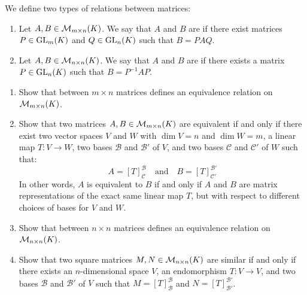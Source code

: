 \begin{definition}
\label{def:equivalence_and_similarity}
We define two types of relations between matrices:
\begin{enumerate}
    \item Let $A, B \in \mathcal{M}_{m \times n}(K)$. We say that $A$ and $B$ are  if there exist matrices $P \in \operatorname{GL}_m(K)$ and $Q \in \operatorname{GL}_n(K)$ such that $B = P A Q$.
    \item Let $A, B \in \mathcal{M}_{n \times n}(K)$. We say that $A$ and $B$ are  if there exists a matrix $P \in \operatorname{GL}_n(K)$ such that $B = P^{-1} A P$.
\end{enumerate}
\end{definition}

\begin{exercise}
\label{exc:equivalence_similarity_properties}
\begin{enumerate}[label=\textbf{(\alph*)}]
    \item Show that  between $m \times n$ matrices defines an equivalence relation on $\mathcal{M}_{m \times n}(K)$.
    \item Show that two matrices $A, B \in \mathcal{M}_{m \times n}(K)$ are equivalent if and only if there exist two vector spaces $V$ and $W$ with $\dim V = n$ and $\dim W = m$, a linear map $T \colon V \to W$, two bases $\mathcal{B}$ and $\mathcal{B}'$ of $V$, and two bases $\mathcal{C}$ and $\mathcal{C}'$ of $W$ such that:
    \begin{equation*}
        A = [T]_{\mathcal{C}}^{\mathcal{B}} \quad \text{and} \quad B = [T]_{\mathcal{C}'}^{\mathcal{B}'}
    \end{equation*}
    In other words, $A$ is equivalent to $B$ if and only if $A$ and $B$ are matrix representations of the exact same linear map $T$, but with respect to different choices of bases for $V$ and $W$.
    \item Show that  between $n \times n$ matrices defines an equivalence relation on $\mathcal{M}_{n \times n}(K)$.
    \item Show that two square matrices $M, N \in \mathcal{M}_{n \times n}(K)$ are similar if and only if there exists an $n$-di\-men\-sional space $V$, an endomorphism $T: V \to V$, and two bases $\mathcal{B}$ and $\mathcal{B}'$ of $V$ such that $M = [T]_{\mathcal{B}}^{\mathcal{B}}$ and $N = [T]_{\mathcal{B}'}^{\mathcal{B}'}$.
\end{enumerate}
\end{exercise}

